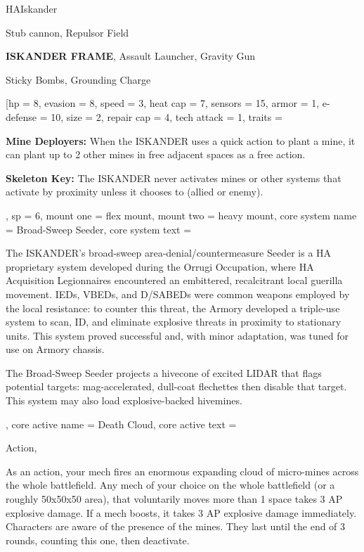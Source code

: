\begin{mech}{HA}{Iskander}


\begin{license}
\item Stub cannon, Repulsor Field
\item \textbf{ISKANDER FRAME}, Assault Launcher, Gravity Gun
\item Sticky Bombs, Grounding Charge
\end{license}

\frameBox
[hp = 8,
evasion = 8,
speed = 3,
heat cap = 7,
sensors = 15,
armor = 1,
e-defense = 10,
size = 2,
repair cap = 4,
tech attack = 1,
traits = {\textbf{Mine Deployers:} When the ISKANDER uses a quick action to plant a mine, it can plant up to 2 other mines in free adjacent spaces as a free action.

\textbf{Skeleton Key:} The ISKANDER never activates mines or other systems that activate by proximity unless it chooses to (allied or enemy).},
sp = 6,
mount one = flex mount,
mount two = heavy mount,
core system name = Broad-Sweep Seeder,
core system text = {The ISKANDER's broad-sweep area-denial/countermeasure Seeder is a HA proprietary system developed during the Orrugi Occupation, where HA Acquisition Legionnaires encountered an embittered, recalcitrant local guerilla movement. IEDs, VBEDs, and D/SABEDs were common weapons employed by the local resistance: to counter this threat, the Armory developed a triple-use system to scan, ID, and eliminate explosive threats in proximity to stationary units. This system proved successful and, with minor adaptation, was tuned for use on Armory chassis.

The Broad-Sweep Seeder projects a hivecone of excited LIDAR that flags potential targets: mag-accelerated, dull-coat flechettes then disable that target. This system may also load explosive-backed hivemines.},
core active name = Death Cloud,
core active text = {Action,

As an action, your mech fires an enormous expanding cloud of micro-mines across the whole battlefield. Any mech of your choice on the whole battlefield (or a roughly 50x50x50 area), that voluntarily moves more than 1 space takes 3 AP explosive damage. If a mech boosts, it takes 3 AP explosive damage immediately. Characters are aware of the presence of the mines. They last until the end of 3 rounds, counting this one, then deactivate.

}
\end{mech}
